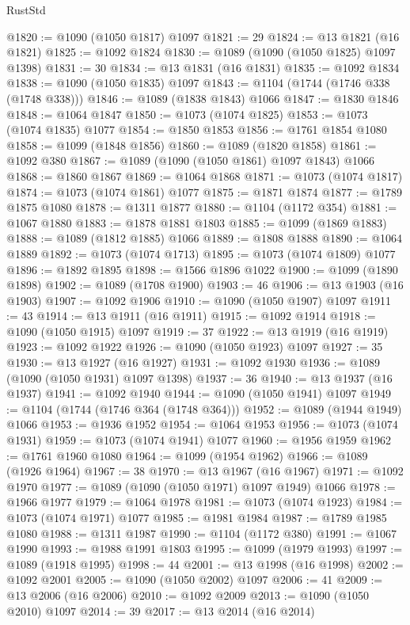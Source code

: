 \begin{lexlean}{RustStd}
\begin{coremodule}
{\begin{coremodule}
{{{{{{{{{{{{{{@1820 := @1090 (@1050 @1817) @1097
@1821 := 29
@1824 := @13 @1821 (@16 @1821)
@1825 := @1092 @1824
@1830 := @1089 (@1090 (@1050 @1825) @1097 @1398)
@1831 := 30
@1834 := @13 @1831 (@16 @1831)
@1835 := @1092 @1834
@1838 := @1090 (@1050 @1835) @1097
@1843 := @1104 (@1744 (@1746 @338 (@1748 @338)))
@1846 := @1089 (@1838 @1843) @1066
@1847 := @1830 @1846
@1848 := @1064 @1847
@1850 := @1073 (@1074 @1825)
@1853 := @1073 (@1074 @1835) @1077
@1854 := @1850 @1853
@1856 := @1761 @1854 @1080
@1858 := @1099 (@1848 @1856)
@1860 := @1089 (@1820 @1858)
@1861 := @1092 @380
@1867 := @1089 (@1090 (@1050 @1861) @1097 @1843) @1066
@1868 := @1860 @1867
@1869 := @1064 @1868
@1871 := @1073 (@1074 @1817)
@1874 := @1073 (@1074 @1861) @1077
@1875 := @1871 @1874
@1877 := @1789 @1875 @1080
@1878 := @1311 @1877
@1880 := @1104 (@1172 @354)
@1881 := @1067 @1880
@1883 := @1878 @1881 @1803
@1885 := @1099 (@1869 @1883)
@1888 := @1089 (@1812 @1885) @1066
@1889 := @1808 @1888
@1890 := @1064 @1889
@1892 := @1073 (@1074 @1713)
@1895 := @1073 (@1074 @1809) @1077
@1896 := @1892 @1895
@1898 := @1566 @1896 @1022
@1900 := @1099 (@1890 @1898)
@1902 := @1089 (@1708 @1900)
@1903 := 46
@1906 := @13 @1903 (@16 @1903)
@1907 := @1092 @1906
@1910 := @1090 (@1050 @1907) @1097
@1911 := 43
@1914 := @13 @1911 (@16 @1911)
@1915 := @1092 @1914
@1918 := @1090 (@1050 @1915) @1097
@1919 := 37
@1922 := @13 @1919 (@16 @1919)
@1923 := @1092 @1922
@1926 := @1090 (@1050 @1923) @1097
@1927 := 35
@1930 := @13 @1927 (@16 @1927)
@1931 := @1092 @1930
@1936 := @1089 (@1090 (@1050 @1931) @1097 @1398)
@1937 := 36
@1940 := @13 @1937 (@16 @1937)
@1941 := @1092 @1940
@1944 := @1090 (@1050 @1941) @1097
@1949 := @1104 (@1744 (@1746 @364 (@1748 @364)))
@1952 := @1089 (@1944 @1949) @1066
@1953 := @1936 @1952
@1954 := @1064 @1953
@1956 := @1073 (@1074 @1931)
@1959 := @1073 (@1074 @1941) @1077
@1960 := @1956 @1959
@1962 := @1761 @1960 @1080
@1964 := @1099 (@1954 @1962)
@1966 := @1089 (@1926 @1964)
@1967 := 38
@1970 := @13 @1967 (@16 @1967)
@1971 := @1092 @1970
@1977 := @1089 (@1090 (@1050 @1971) @1097 @1949) @1066
@1978 := @1966 @1977
@1979 := @1064 @1978
@1981 := @1073 (@1074 @1923)
@1984 := @1073 (@1074 @1971) @1077
@1985 := @1981 @1984
@1987 := @1789 @1985 @1080
@1988 := @1311 @1987
@1990 := @1104 (@1172 @380)
@1991 := @1067 @1990
@1993 := @1988 @1991 @1803
@1995 := @1099 (@1979 @1993)
@1997 := @1089 (@1918 @1995)
@1998 := 44
@2001 := @13 @1998 (@16 @1998)
@2002 := @1092 @2001
@2005 := @1090 (@1050 @2002) @1097
@2006 := 41
@2009 := @13 @2006 (@16 @2006)
@2010 := @1092 @2009
@2013 := @1090 (@1050 @2010) @1097
@2014 := 39
@2017 := @13 @2014 (@16 @2014)
}}}}}}}}}}}}}}
\end{coremodule}}
\end{coremodule}
\end{lexlean}
